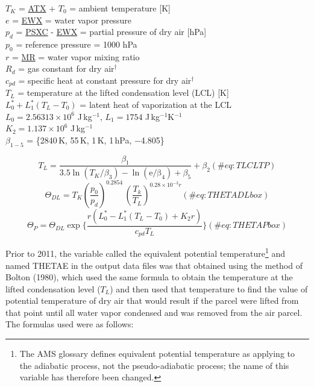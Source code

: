 \documentclass[
  english,
]{book}
\begin{document}
\(T_K\) = \protect\hyperlink{ambient-t}{ATX} + \(T_0\) = ambient
temperature {[}K{]}\\
\(e\) = \protect\hyperlink{ewx}{EWX} = water vapor pressure\\
\(p_d\) = \protect\hyperlink{psx}{PSXC} - \protect\hyperlink{ewx}{EWX} =
partial pressure of dry air {[}hPa{]}\\
\(p_{0}\) = reference pressure = 1000 hPa\\
\(r\) = \protect\hyperlink{MR}{MR} = water vapor mixing ratio\\
\(R_{d}\) = gas constant for dry air\(^{\dagger}\)\\
\(c_{pd}\) = specific heat at constant pressure for dry
air\(^{\dagger}\)\\
\(T_L\) = temperature at the lifted condensation level (LCL) {[}K{]}\\
\(L_0^*+L_1^*(T_L-T_0)\) = latent heat of vaporization at the LCL\\
\(L_0=2.56313 × 10^6\) J\(\,\)kg\(^{-1}\), \(L_1=1754\)
J\(\,\)kg\(^{-1}\)K\(^{-1}\)\\
\(K_2=1.137 × 10^6\) J\(\,\)kg\(^{-1}\)\\
\(\beta_{1-5}\) = \{2840 K, 55 K, 1 K, 1 hPa, −4.805\}

\begin{equation}
T_{L}=\frac{\beta_{1}}{3.5\ln(T_{K}/\beta_{3})-\ln(\mathrm{e/\beta_{4}})+\beta_{5}}+\beta_{2}
(\#eq:TLCLTP)
\end{equation} \begin{equation}
\Theta_{DL}=T_{K}(\frac{p_{0}}{p_{d}})^{0.2854}\,(\frac{T_{k}}{T_{L}})^{0.28\times10^{-3}r}
(\#eq:THETADLbox)
\end{equation} \begin{equation}
\Theta_{P}=\Theta_{DL}\exp\{\frac{r(L_{0}^{*}-L_{1}^{*}(T_{L}-T_{0})+K_{2}r)}{c_{pd}T_{L}}\}
(\#eq:THETAPbox)
\end{equation}

Prior to 2011, the variable called the equivalent potential
temperature\footnote{The AMS glossary defines equivalent potential
  temperature as applying to the adiabatic process, not the
  pseudo-adiabatic process; the name of this variable has therefore been
  changed.} and named THETAE in the output data files was that obtained
using the method of Bolton (1980), which used the same formula to obtain
the temperature at the lifted condensation level (\(T_L\)) and then used
that temperature to find the value of potential temperature of dry air
that would result if the parcel were lifted from that point until all
water vapor condensed and was removed from the air parcel. The formulas
used were as follows:
\end{document}
